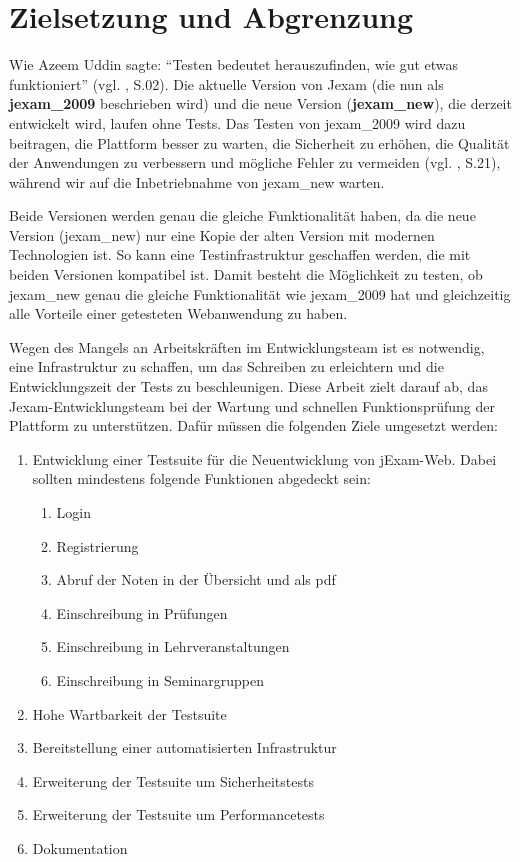 
\section{Zielsetzung und Abgrenzung}


Wie Azeem Uddin  sagte: ``Testen bedeutet herauszufinden, wie gut etwas funktioniert'' (vgl. \cite{anand12importance}, S.02).
Die aktuelle Version von Jexam (die nun als \textbf{\Gls{jexam_2009}} beschrieben wird) und die neue Version (\textbf{\Gls{jexam_new}}),
die derzeit entwickelt wird, laufen ohne Tests. Das Testen von \Gls{jexam_2009} wird dazu beitragen, die Plattform
besser zu warten, die Sicherheit zu erhöhen, die Qualität der Anwendungen zu verbessern und mögliche Fehler zu
vermeiden (vgl. \cite{shultz2011software}, S.21), während wir auf die Inbetriebnahme von \Gls{jexam_new} warten.


Beide Versionen werden genau die gleiche Funktionalität haben, da die neue Version (\Gls{jexam_new}) nur eine Kopie der
alten Version mit modernen Technologien ist. So kann eine Testinfrastruktur geschaffen werden, die mit beiden Versionen
kompatibel ist. Damit besteht die Möglichkeit zu testen, ob \Gls{jexam_new} genau die gleiche Funktionalität wie
\Gls{jexam_2009} hat und gleichzeitig alle Vorteile einer
getesteten Webanwendung zu haben.

Wegen des Mangels an Arbeitskräften im Entwicklungsteam ist es notwendig,
eine Infrastruktur zu schaffen, um das Schreiben zu erleichtern und die
Entwicklungszeit der Tests zu beschleunigen. Diese Arbeit zielt darauf ab,
das Jexam-Entwicklungsteam bei der Wartung und schnellen Funktionsprüfung der
Plattform zu unterstützen. Dafür müssen die folgenden Ziele umgesetzt werden:


\begin{enumerate}
    \item Entwicklung einer Testsuite für die Neuentwicklung von jExam-Web.
    Dabei sollten mindestens folgende Funktionen abgedeckt sein:
    \begin{enumerate}
        \item Login
        \item Registrierung
        \item Abruf der Noten in der Übersicht und als pdf
        \item Einschreibung in Prüfungen
        \item Einschreibung in Lehrveranstaltungen
        \item Einschreibung in Seminargruppen
    \end{enumerate}
    \item Hohe Wartbarkeit der Testsuite
    \item Bereitstellung einer automatisierten Infrastruktur
    \item Erweiterung der Testsuite um Sicherheitstests
    \item Erweiterung der Testsuite um Performancetests
    \item Dokumentation
\end{enumerate}